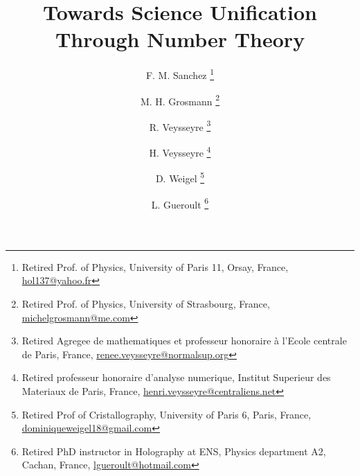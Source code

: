 \documentclass[a4paper,9pt]{article}
\title{Towards Science Unification Through Number Theory}
\author{F. M. Sanchez \thanks{Retired Prof. of Physics, University of Paris 11, Orsay, France, \href{mailto:hol137@yahoo.fr}{hol137@yahoo.fr}} 
   \and M. H. Grosmann \thanks{Retired Prof. of Physics, University of Strasbourg, France, \href{mailto:michelgrosmann@me.com}{michelgrosmann@me.com}}
   \and R. Veysseyre \thanks{Retired Agregee de mathematiques et professeur honoraire \`a l'Ecole centrale de Paris, France,
   \href{mailto:renee.veysseyre@normalsup.org}{renee.veysseyre@normalsup.org}}
   \and H. Veysseyre \thanks{Retired professeur honoraire d'analyse numerique, Institut Superieur des Materiaux de Paris, France,
   \href{mailto:henri.veysseyre@centraliens.net}{henri.veysseyre@centraliens.net}}
   \and D. Weigel  \thanks{Retired Prof of Cristallography, University of Paris 6, Paris, France, \href{mailto:dominiqueweigel18@gmail.com}{dominiqueweigel18@gmail.com}} 
   \and L. Gueroult \thanks{Retired PhD instructor in Holography at ENS, Physics department A2, Cachan, France, \href{mailto:lgueroult@hotmail.com}{lgueroult@hotmail.com}}
   }
\begin{document}
\setcounter{page}{1}

\maketitle

\begin{abstract}






\end{abstract}
\end{document}
